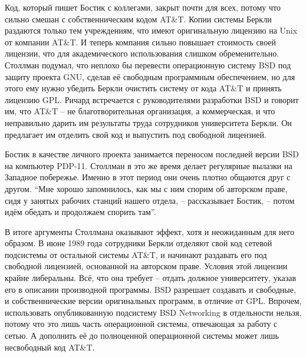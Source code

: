 Код, который пишет Бостик с коллегами, закрыт почти для всех, потому что сильно смешан с собственническим кодом AT\&T. Копии системы Беркли раздаются только тем учреждениям, что имеют оригинальную лицензию на Unix от компании AT\&T. И теперь компания сильно повышает стоимость своей лицензии, что для академического использования слишком обременительно. Столлман подумал, что неплохо бы перевести операционную систему BSD под защиту проекта GNU, сделав её свободным программным обеспечением, но для этого ему нужно убедить Беркли очистить систему от кода AT\&T и принять лицензию GPL. Ричард встречается с руководителями разработки BSD и говорит им, что AT\&T -- не благотворительная организация, а коммерческая, и что неправильно дарить им результаты труда сотрудников университета Беркли. Он предлагает им отделить свой код и выпустить под свободной лицензией.

Бостик в качестве личного проекта занимается переносом последней версии BSD на компьютер PDP-11. Столлман в это же время делает регулярные вылазки на Западное побережье. Именно в этот период они очень плотно общаются друг с другом. \enquote{Мне хорошо запомнилось, как мы с ним спорим об авторском праве, сидя у занятых рабочих станций нашего отдела, -- рассказывает Бостик, -- потом идём обедать и продолжаем спорить там}.

В итоге аргументы Столлмана оказывают эффект, хотя и неожиданным для него образом. В июне 1989 года сотрудники Беркли отделяют свой код сетевой подсистемы от остальной системы AT\&T, и начинают раздавать его под свободной лицензией, основанной на авторском праве. Условия этой лицензии крайне либеральны. Всё, что она требует -- отдать должное университету, указав его в описании производной программы.  BSD разрешает создавать и свободные, и собственнические версии оригинальных программ, в отличие от GPL. Впрочем, использовать опубликованную подсистему BSD Networking в отдельности нельзя, потому что это лишь часть операционной системы, отвечающая за работу с сетью. А дополнить её до полноценной операционной системы может лишь несвободный код AT\&T.

